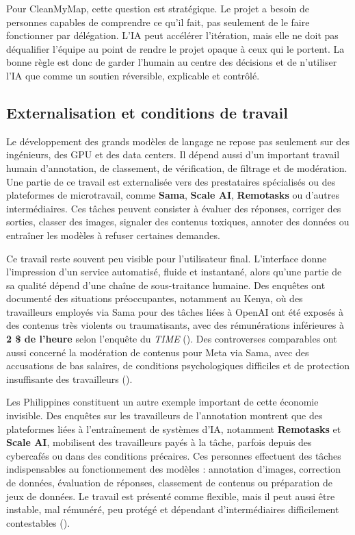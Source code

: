 \documentclass[
  10pt,
  a4paper,
  DIV=11,
  numbers=noendperiod,
  oneside]{scrreprt}
\let\oldtextbf\textbf
\renewcommand{\textbf}[1]{\oldtextbf{\textcolor{cmmnavy}{#1}}}
\let\oldemph\emph
\renewcommand{\emph}[1]{\oldemph{\textcolor{cmmgray}{#1}}}
\begin{document}
Pour CleanMyMap, cette question est stratégique. Le projet a besoin de
personnes capables de comprendre ce qu'il fait, pas seulement de le
faire fonctionner par délégation. L'IA peut accélérer l'itération, mais
elle ne doit pas déqualifier l'équipe au point de rendre le projet
opaque à ceux qui le portent. La bonne règle est donc de garder l'humain
au centre des décisions et de n'utiliser l'IA que comme un soutien
réversible, explicable et contrôlé.

\subsection{Externalisation et conditions de
travail}\label{externalisation-et-conditions-de-travail}

Le développement des grands modèles de langage ne repose pas seulement
sur des ingénieurs, des GPU et des data centers. Il dépend aussi d'un
important travail humain d'annotation, de classement, de vérification,
de filtrage et de modération. Une partie de ce travail est externalisée
vers des prestataires spécialisés ou des plateformes de microtravail,
comme \textbf{Sama}, \textbf{Scale AI}, \textbf{Remotasks} ou d'autres
intermédiaires. Ces tâches peuvent consister à évaluer des réponses,
corriger des sorties, classer des images, signaler des contenus
toxiques, annoter des données ou entraîner les modèles à refuser
certaines demandes.

Ce travail reste souvent peu visible pour l'utilisateur final.
L'interface donne l'impression d'un service automatisé, fluide et
instantané, alors qu'une partie de sa qualité dépend d'une chaîne de
sous-traitance humaine. Des enquêtes ont documenté des situations
préoccupantes, notamment au Kenya, où des travailleurs employés via Sama
pour des tâches liées à OpenAI ont été exposés à des contenus très
violents ou traumatisants, avec des rémunérations inférieures à
\textbf{2 \$ de l'heure} selon l'enquête du \emph{TIME}
(). Des controverses
comparables ont aussi concerné la modération de contenus pour Meta via
Sama, avec des accusations de bas salaires, de conditions psychologiques
difficiles et de protection insuffisante des travailleurs
().

Les Philippines constituent un autre exemple important de cette économie
invisible. Des enquêtes sur les travailleurs de l'annotation montrent
que des plateformes liées à l'entraînement de systèmes d'IA, notamment
\textbf{Remotasks} et \textbf{Scale AI}, mobilisent des travailleurs
payés à la tâche, parfois depuis des cybercafés ou dans des conditions
précaires. Ces personnes effectuent des tâches indispensables au
fonctionnement des modèles : annotation d'images, correction de données,
évaluation de réponses, classement de contenus ou préparation de jeux de
données. Le travail est présenté comme flexible, mais il peut aussi être
instable, mal rémunéré, peu protégé et dépendant d'intermédiaires
difficilement contestables ().
\end{document}
